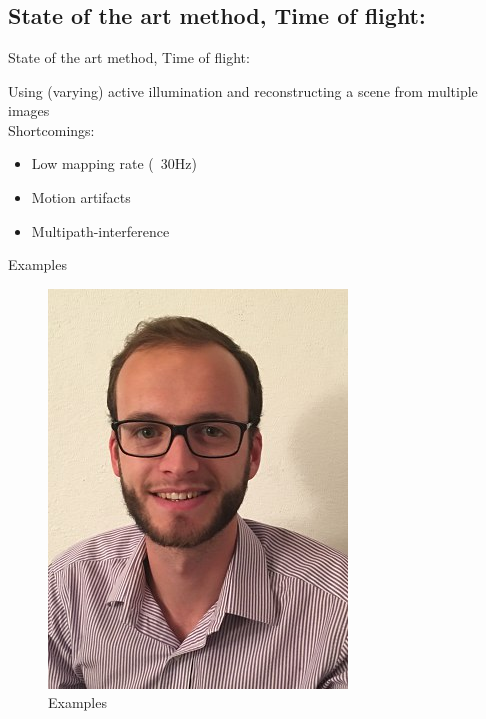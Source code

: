 %
%
\section{}
\subsection{State of the art method, Time of flight:}
\begin{frame}{State of the art method, Time of flight:}

Using (varying) active illumination and reconstructing a scene from multiple images\\
Shortcomings:
\begin{itemize}
\item Low mapping rate (~30Hz)
\item Motion artifacts
\item Multipath-interference
\end{itemize}

\end{frame}

\begin{frame}{Examples}
\begin{figure}
\includegraphics[scale=0.9]{pictures/polop}
\caption{Examples}
\end{figure}
\end{frame}

